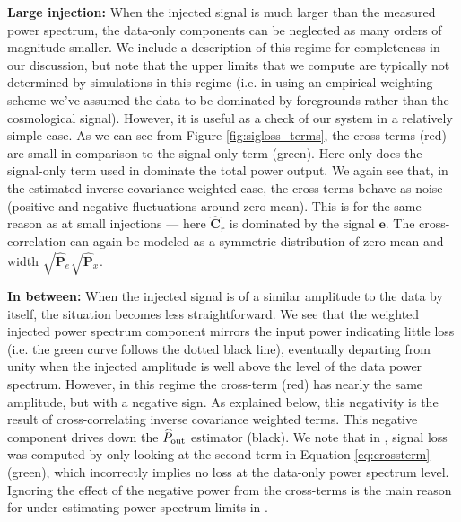 \documentclass[preprint2,numberedappendix,tighten]{aastex6}  %
\begin{document}
{\bf Large injection:}
When the injected signal is much larger than the measured power spectrum, the data-only components can 
be neglected as many orders of magnitude smaller. We include a description of this regime for completeness in our discussion, but note that the upper limits that we compute are typically not determined by simulations in this regime (i.e. in using an empirical weighting scheme we've assumed the data to be dominated by foregrounds rather than the cosmological signal).  However, it is useful as a check of our system in a relatively simple case. As we can see from Figure \ref{fig:sigloss_terms}, the cross-terms (red) are small in comparison to the signal-only term (green). Here only does the signal-only term used in   dominate the total power output. We again see that, in the estimated inverse covariance weighted case, the cross-terms behave as noise (positive and negative fluctuations around zero mean). This is for the same reason as at small injections --- here $\widehat{\textbf{C}}_{r}$ is dominated by the signal $\textbf{e}$. The cross-correlation can again be modeled as a symmetric distribution of zero mean and width $\sqrt{\widehat{\textbf{P}}_e}\sqrt{\widehat{\textbf{P}}_x}$.

{\bf In between:}
When the injected signal is of a similar amplitude to the data by itself, the situation becomes less straightforward. We see that 
the weighted injected power spectrum component mirrors the input power indicating little loss (i.e. the green curve follows the dotted black line), eventually 
departing from unity when the injected amplitude is well above the level of the data power spectrum. However, 
in this regime the cross-term (red) has nearly the same amplitude, but with a negative sign. As explained below, this negativity is the result of cross-correlating inverse covariance weighted terms.  This negative component drives down the $\widehat{P}_{\rm out}$ estimator (black). We note that in , signal loss was computed by only looking at the second term in Equation \eqref{eq:crossterm} (green), which incorrectly implies no loss at the data-only power spectrum level. Ignoring the effect of the negative power from the cross-terms is the main reason for under-estimating power spectrum limits in .
\end{document}
